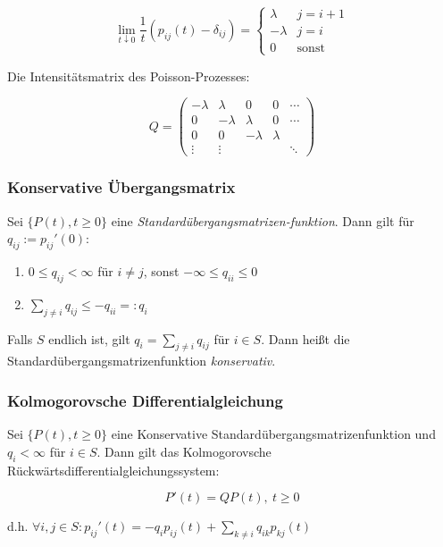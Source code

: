 \vspace*{-4mm}
\[ \lim_{t\downarrow0} \frac{1}{t} (p_{ij}(t) - \delta_{ij}) = \begin{cases} \lambda & j = i+1 \\ -\lambda & j=i \\ 0 & \text{sonst}\end{cases} \]

Die Intensitätsmatrix des Poisson-Prozesses:

\[ Q = \begin{pmatrix} -\lambda & \lambda & 0 & 0 & \cdots \\ 0 & -\lambda & \lambda & 0 & \cdots \\ 0 & 0 & -\lambda & \lambda & \\ \vdots & \vdots & & & \ddots \end{pmatrix} \]

\subsubsection*{Konservative Übergangsmatrix}

Sei $\{P(t),t \geq 0\}$ eine \emph{Standardübergangsmatrizen-funktion}. Dann gilt für $q_{ij}:=p_{ij}'(0)$:

\begin{enumerate}[label=(\alph*)]
	\item $0 \leq q_{ij} < \infty$ für $i \neq j$, sonst $-\infty \leq q_{ii} \leq 0$
	\item $\sum_{j\neq i} q_{ij} \leq -q_{ii} =: q_i$
\end{enumerate}

Falls $S$ endlich ist, gilt $q_i = \sum_{j\neq i} q_{ij}$ für $i \in S$. Dann heißt die Standardübergangsmatrizenfunktion \emph{konservativ}.

\subsubsection*{Kolmogorovsche Differentialgleichung}

Sei $\{P(t),t \geq 0\}$ eine Konservative Standardübergangsmatrizenfunktion und $q_i < \infty$ für $i \in S$. Dann gilt das Kolmogorovsche Rückwärtsdifferentialgleichungssystem:

\vspace*{-2mm}
\[ P'(t) = QP(t), \ t \geq 0 \]

d.h. $\forall i,j \in S : p_{ij}'(t) = -q_i p_{ij}(t) + \sum_{k \neq i} q_{ik} p_{kj}(t)$

